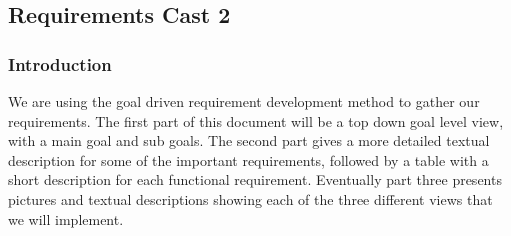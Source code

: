 \documentclass[../document]{subfiles}
\begin{document}
\subsection{Requirements Cast 2}
\subsubsection{Introduction}
We are using the goal driven requirement development method to gather our requirements. The first part of this document will be a top down goal level view, with a main goal and sub goals. The second part gives a more detailed textual description for some of the important requirements, followed by a table with a short description for each functional requirement. Eventually part three presents pictures and textual descriptions showing each of the three different views that we will implement.
\end{document}
